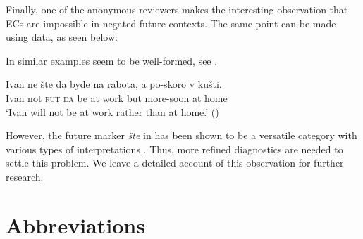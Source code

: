 \documentclass[output=paper,colorlinks,citecolor=brown,newtxmath]{langsci/langscibook}
\begin{document}
\noindent Finally, one of the anonymous reviewers makes the interesting observation that  ECs are impossible in negated future contexts. The same point can be made using  data, as seen below:

	\z

\noindent In  similar examples seem to be well-formed, see .

\ea \gll Ivan ne šte da byde na rabota, a po-skoro v kušti.\\
    Ivan not \textsc{fut} \textsc{da} be at work but more-soon at home\\
    \glt `Ivan will not be at work rather than at home.'  \hfill () \label{bulgfut}
    \z


\noindent However, the future marker \textit{šte} in  has been shown to be a versatile category with various types of interpretations \citep{rivsimeo14}. Thus, more refined diagnostics are needed to settle this problem. We leave a detailed account of this observation for further research.



\nopagebreak
\section*{Abbreviations}
\end{document}
